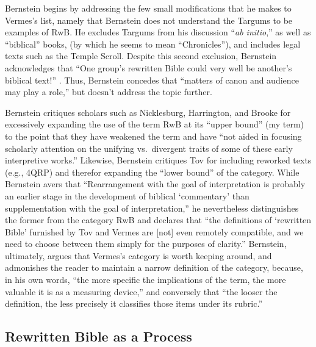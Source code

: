Bernstein begins by addressing the few small modifications that he makes
to Vermes's list, namely that Bernstein does not understand the Targums
to be examples of RwB. He excludes Targums from his discussion
``\emph{ab initio},'' as well as ``biblical'' books, (by which he seems
to mean ``Chronicles''), and includes legal texts such as the
Temple Scroll. Despite this second exclusion, Bernstein acknowledges
that ``One group's rewritten Bible could very well be another's biblical
text!'' \autocite[175. This seems particularly odd, since, and Ethiopian
Christian may protest that Jubilees should be excluded as
well.]{bernstein_textus2005}. Thus, Bernstein concedes that ``matters of
canon and audience may play a role,'' but doesn't address the topic
further.

Bernstein critiques scholars such as
Nicklesburg,\autocite{nickelsburg_stone1984}
Harrington,\autocite{harrington_kraft-nickelsburg1986} and
Brooke\autocite{brooke_schiffman-vanderkam2000} for excessively
expanding the use of the term RwB at its ``upper bound'' (my term) to
the point that they have weakened the term and have ``not aided in
focusing scholarly attention on the unifying vs.~divergent traits of
some of these early interpretive
works.''\autocite[179]{bernstein_textus2005} Likewise, Bernstein
critiques Tov for including reworked texts (e.g., 4QRP) and therefor
expanding the ``lower bound'' of the category. While Bernstein avers
that ``Rearrangement with the goal of interpretation is probably an
earlier stage in the development of biblical `commentary' than
supplementation with the goal of interpretation,'' he nevertheless
distinguishes the former from the category RwB and declares that ``the
definitions of `rewritten Bible' furnished by Tov and Vermes are
{[}not{]} even remotely compatible, and we need to choose between them
simply for the purposes of
clarity.''\autocite[185]{bernstein_textus2005} Bernstein, ultimately,
argues that Vermes's category is worth keeping around, and admonishes
the reader to maintain a narrow definition of the category, because, in
his own words, ``the more specific the implications of the term, the
more valuable it is as a measuring
device,''\autocite[195]{bernstein_textus2005} and conversely that ``the
looser the definition, the less precisely it classifies those items
under its rubric.'' \autocite[195]{bernstein_textus2005}

\subsection{Rewritten Bible as a Process}\label{rwb-as-a-process}

